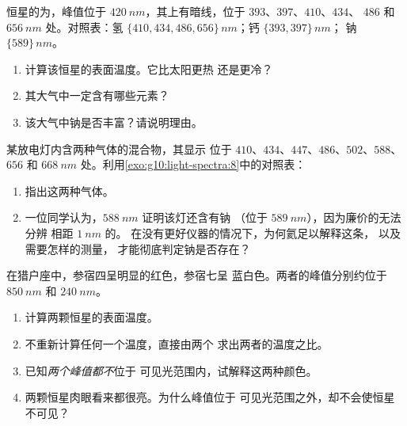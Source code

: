 \begin{exercise}[$\star\star\star$]\label{exo:g10:light-spectra:13}
恒星的为，峰值位于
$\qty{420}{nm}$，其上有暗线，位于 $393$、$397$、$410$、$434$、
$486$ 和 $\qty{656}{nm}$ 处。对照表：氢
$\{410, 434, 486, 656\}\,\unit{nm}$；钙 $\{393, 397\}\,\unit{nm}$；
钠 $\{589\}\,\unit{nm}$。
\begin{enumerate}
  \item 计算该恒星的表面温度。它比太阳更热
        还是更冷？
  \item 其大气中一定含有哪些元素？
  \item 该大气中钠是否丰富？请说明理由。
\end{enumerate}
\end{exercise}

\begin{exercise}[$\star\star\star$]\label{exo:g10:light-spectra:14}
某放电灯内含两种气体的混合物，其显示
位于 $410$、$434$、$447$、$486$、$502$、$588$、$656$ 和
$\qty{668}{nm}$ 处。利用\cref{exo:g10:light-spectra:8}中的对照表：
\begin{enumerate}
  \item 指出这两种气体。
  \item 一位同学认为，$\qty{588}{nm}$ 证明该灯还含有钠
        （位于 $\qty{589}{nm}$），因为廉价的无法分辨
        相距 $\qty{1}{nm}$ 的。
        在没有更好仪器的情况下，为何氦足以解释这条，
        以及需要怎样的测量，
        才能彻底判定钠是否存在？
\end{enumerate}
\end{exercise}

\begin{exercise}[$\star\star\star$]\label{exo:g10:light-spectra:15}
在猎户座中，参宿四呈明显的红色，参宿七呈
蓝白色。两者的峰值分别约位于 $\qty{850}{nm}$ 和
$\qty{240}{nm}$。
\begin{enumerate}
  \item 计算两颗恒星的表面温度。
  \item 不重新计算任何一个温度，直接由两个
        求出两者的温度之比。
  \item 已知\emph{两个峰值都不}位于
        可见光范围内，试解释这两种颜色。
  \item 两颗恒星肉眼看来都很亮。为什么峰值位于
        可见光范围之外，却不会使恒星不可见？
\end{enumerate}
\end{exercise}

